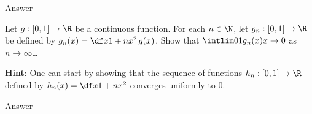 \documentclass[a4paper]{article}
\begin{document}
Answer



\begin{questionbody}
Let $g : [0, 1] \to \R$ be a continuous function. For each $n \in \N$, let $g_n : [0, 1] \to \R$ be defined by $g_n(x) = \df x{1 + nx^2} \, g(x)$. Show that $\intlim 01 {g_n(x)} x \to 0$ as $n \to \infty$\dots

\textbf{Hint}: One can start by showing that the sequence of functions $h_n : [0, 1] \to \R$ defined by $h_n(x) = \df x{1 + nx^2}$ converges uniformly to 0.
\end{questionbody}

Answer

\end{document}
